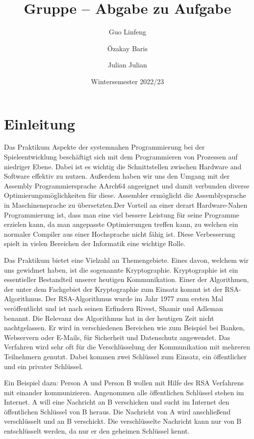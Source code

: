 \documentclass[course=asp]{aspdoc}
\author{Guo Linfeng \and Özakay Baris \and Julian Julian}
\date{Wintersemester 2022/23} %
\title{Gruppe \theGroup{} -- Abgabe zu Aufgabe \theNumber}
\begin{document}
\maketitle

\section{Einleitung}
Das Praktikum Aspekte der systemnahen Programmierung bei der Spieleentwicklung beschäftigt sich mit dem Programmieren von Prozessen auf niedriger Ebene. Dabei ist es wichtig die Schnittstellen zwischen Hardware and Software effektiv zu nutzen. Außerdem haben wir uns den Umgang mit der Assembly Programmiersprache AArch64 angeeignet und damit verbunden diverse Optimierungsmöglichkeiten für diese. Assembler ermöglicht die Assemblysprache in Maschinensprache zu übersetzten.Der Vorteil an einer derart Hardware-Nahen Programmierung ist, dass man eine viel bessere Leistung für seine Programme erzielen kann, da man angepasste Optimierungen treffen kann, zu welchen ein normaler Compiler aus einer Hochsprache nicht fähig ist. Diese Verbesserung spielt in vielen Bereichen der Informatik eine wichtige Rolle.

Das Praktikum bietet eine Vielzahl an Themengebiete. Eines davon, welchem wir uns gewidmet haben, ist die sogenannte Kryptographie. Kryptographie ist ein essentieller Bestandteil unserer heutigen Kommunikation. Einer der Algorithmen, der unter dem Fachgebiet der Kryptographie zum Einsatz kommt ist der RSA-Algorithmus. Der RSA-Algorithmus wurde im Jahr 1977 zum ersten Mal veröffentlicht und ist nach seinen Erfindern Rivest, Shamir und Adleman benannt. Die Relevanz des Algorithmus hat in der heutigen Zeit nicht nachtgelassen. Er wird in verschiedenen Bereichen wie zum Beispiel bei Banken, Webservern oder E-Mails, für Sicherheit und Datenschutz angewendet. Das Verfahren wird sehr oft für die Verschlüsselung der Kommunikation mit mehreren Teilnehmern genutzt. Dabei kommen zwei Schlüssel zum Einsatz, ein öffentlicher und ein privater Schlüssel. \cite{TTheRSAAlgorithm}

Ein Beispiel dazu: Person A und Person B wollen mit Hilfe des RSA Verfahrens mit einander kommunizieren. Angenommen alle öffentlichen Schlüssel stehen im Internet. A will eine Nachricht an B verschicken und sucht im Internet den öffentlichen Schlüssel von B heraus. Die Nachricht von A wird anschließend verschlüsselt und an B verschickt. Die verschlüsselte Nachricht kann nur von B entschlüsselt werden, da nur er den geheimen Schlüssel kennt. 
 
\end{document}
